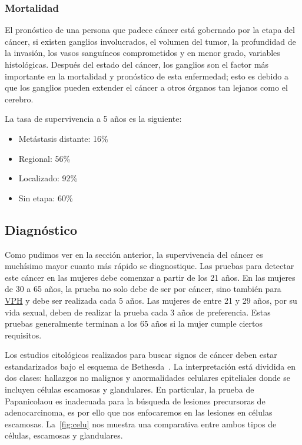 \subsubsection{Mortalidad}
El pronóstico de una persona que padece cáncer está gobernado por la etapa del cáncer,
si existen ganglios involucrados, el volumen del tumor, la profundidad de la invasión,
los vasos sanguíneos comprometidos y en menor grado, variables histológicas. Después del
estado del cáncer, los ganglios son el factor más importante en la mortalidad y pronóstico
de esta enfermedad; esto es debido a que los ganglios pueden extender el cáncer a otros órganos
tan lejanos como el cerebro.

La tasa de supervivencia a 5 años es la siguiente:

\begin{itemize}
    \item Metástasis distante: 16\%
    \item Regional: 56\%
    \item Localizado: 92\%
    \item Sin etapa: 60\%
\end{itemize}

\subsection{Diagnóstico}

Como pudimos ver en la sección anterior, la supervivencia del cáncer es
muchísimo mayor cuanto más rápido se diagnostique. Las pruebas para detectar
este cáncer en las mujeres debe comenzar a partir de los 21 años. En las mujeres
de 30 a 65 años, la prueba no solo debe de ser por cáncer, sino también para
\hyperlink{abbr}{VPH} y debe ser realizada cada 5 años. Las mujeres de entre 21
y 29 años, por su vida sexual, deben de realizar la prueba cada 3 años de
preferencia. Estas pruebas generalmente terminan a los 65 años si la mujer
cumple ciertos requisitos.

Los estudios citológicos realizados para buscar signos de cáncer deben estar
estandarizados bajo el esquema de Bethesda~\cite{Kurman1995}. La interpretación
está dividida en dos clases: hallazgos no malignos y anormalidades celulares
epiteliales donde se incluyen células escamosas y glandulares. En particular, la
prueba de Papanicolaou es inadecuada para la búsqueda de lesiones precursoras de
adenocarcinoma, es por ello que nos enfocaremos en las lesiones en células
escamosas. La~\autoref{fig:celu} nos muestra una comparativa entre ambos tipos
de células, escamosas y glandulares. 


